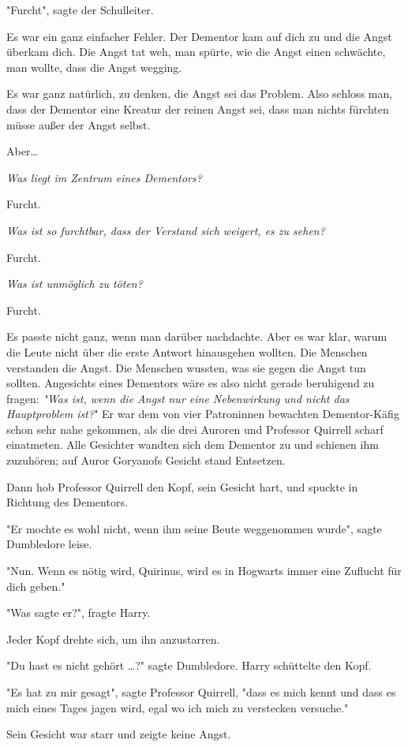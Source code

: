 {"Furcht", sagte der Schulleiter.

Es war ein ganz einfacher Fehler. Der Dementor kam auf dich zu und die Angst überkam dich. Die Angst tat weh, man spürte, wie die Angst einen schwächte, man wollte, dass die Angst wegging.

Es war ganz natürlich, zu denken, die Angst sei das Problem. Also schloss man, dass der Dementor eine Kreatur der reinen Angst sei, dass man nichts fürchten müsse außer der Angst selbst.

Aber…

\emph{Was liegt im Zentrum eines Dementors?}

Furcht.

\emph{Was ist so furchtbar, dass der Verstand sich weigert, es zu sehen?}

Furcht.

\emph{Was ist unmöglich zu töten?}

Furcht.

Es passte nicht ganz, wenn man darüber nachdachte. Aber es war klar, warum die Leute nicht über die erste Antwort hinausgehen wollten. Die Menschen verstanden die Angst. Die Menschen wussten, was sie gegen die Angst tun sollten. Angesichts eines Dementors wäre es also nicht gerade beruhigend zu fragen: \emph{"Was ist, wenn die Angst nur eine Nebenwirkung und nicht das} \emph{Hauptproblem ist?}" Er war dem von vier Patroninnen bewachten Dementor-Käfig schon sehr nahe gekommen, als die drei Auroren und Professor Quirrell scharf einatmeten. Alle Gesichter wandten sich dem Dementor zu und schienen ihm zuzuhören; auf Auror Goryanofs Gesicht stand Entsetzen.

Dann hob Professor Quirrell den Kopf, sein Gesicht hart, und spuckte in Richtung des Dementors.

"Er mochte es wohl nicht, wenn ihm seine Beute weggenommen wurde", sagte Dumbledore leise.

"Nun. Wenn es nötig wird, Quirinus, wird es in Hogwarts immer eine Zuflucht für dich geben."

"Was sagte er?", fragte Harry.

Jeder Kopf drehte sich, um ihn anzustarren.

"Du hast es nicht gehört …?" sagte Dumbledore. Harry schüttelte den Kopf.

"Es hat zu mir gesagt", sagte Professor Quirrell, "dass es mich kennt und dass es mich eines Tages jagen wird, egal wo ich mich zu verstecken versuche."

Sein Gesicht war starr und zeigte keine Angst.

}
